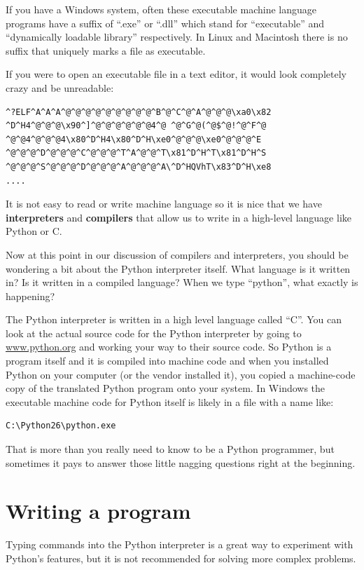 \documentclass[11pt]{book}
\begin{document}
If you have a Windows system, often these executable machine language programs have a
suffix of ``.exe'' or ``.dll'' which stand for ``executable'' and ``dynamically loadable
library'' respectively.  In Linux and Macintosh there is no suffix that uniquely marks
a file as executable.

If you were to open an executable file in a text editor, it would look 
completely crazy and be unreadable:

\beforeverb
\begin{verbatim}
^?ELF^A^A^A^@^@^@^@^@^@^@^@^@^B^@^C^@^A^@^@^@\xa0\x82
^D^H4^@^@^@\x90^]^@^@^@^@^@^@4^@ ^@^G^@(^@$^@!^@^F^@
^@^@4^@^@^@4\x80^D^H4\x80^D^H\xe0^@^@^@\xe0^@^@^@^E
^@^@^@^D^@^@^@^C^@^@^@^T^A^@^@^T\x81^D^H^T\x81^D^H^S
^@^@^@^S^@^@^@^D^@^@^@^A^@^@^@^A\^D^HQVhT\x83^D^H\xe8
....
\end{verbatim}
\afterverb
%
It is not easy to read or write machine language so it is nice that we have
{\bf interpreters} and {\bf compilers} that allow us to write in a high-level
language like Python or C.

Now at this point in our discussion of compilers and interpreters, you should 
be wondering a bit about the Python interpreter itself.  What language is 
it written in?  Is it written in a compiled language?  When we type
``python'', what exactly is happening?

The Python interpreter is written in a high level language called ``C''.  
You can look at the actual source code for the Python interpreter by
going to \url{www.python.org} and working your way to their source code.
So Python is a program itself and it is compiled into machine code and
when you installed Python on your computer (or the vendor installed it),
you copied a machine-code copy of the translated Python program onto your
system.   In Windows the executable machine code for Python itself is likely
in a file with a name like:

\beforeverb
\begin{verbatim}
C:\Python26\python.exe
\end{verbatim}
\afterverb
%
That is more than you really need to know to be a Python programmer, but
sometimes it pays to answer those little nagging questions right at 
the beginning.

\section{Writing a program}

Typing commands into the Python interpreter is a great way to experiment 
with Python’s features, but it is not recommended for solving more complex problems.
\end{document}
